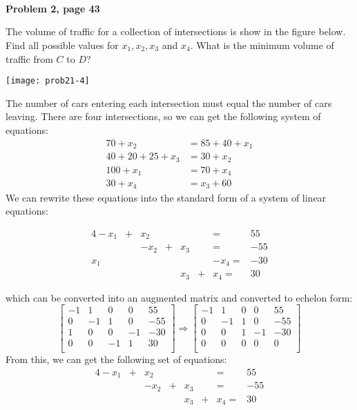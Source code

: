 \documentclass[12pt]{article}
\title{
    \vspace{2in}
    \textmd{\textbf{\hmwkTitle}}\\
    \large\vspace{0.1in}{\hmwkClass}\\
    \large\vspace{0.1in}{\textbf{Date: }\hmwkDueDate}\\
    \vspace{0.1in}{\textbf{Professor: }\hmwkClassInstructor}
    \vspace{1in}
}
\author{\hmwkAuthorName}
\date{}
\begin{document}
\textbf{Problem 2, page 43}

The volume of traffic for a collection of intersections is show in the figure below. Find all possible values for $x_1, x_2, x_3$ and $x_4$. What is the minimum volume of traffic from $C$ to $D$?

\texttt{[image: prob21-4]}

\begin{solution}
The number of cars entering each intersection must equal the number of cars leaving. There are four intersections, so  we can get the following system of equations:
\begin{align*}
70 + x_2 &= 85 + 40 + x_1 \label{A} \\
40 + 20 + 25 + x_3 &= 30 + x_2 \\
100 + x_1 &= 70 + x_4 \\
30 + x_4 &= x_3 + 60
\end{align*}
We can rewrite these equations into the standard form of a system of linear equations:

\begin{alignat*}{4}
-x_1  & {}+{} & x_2  & {}{} & {}{}  & {}{} & {}={} & 55 \\
 {}{} & {}{} &  -x_2 & {}+{} &  x_3 & {}{} & {}={} &  -55 \\
  x_1 & {}{} & {}{} & {}{} & {}{} & {}{} & -x_4 {}={} & -30 \\
 {}{} & {}{} & {}{} & {}{} & x_3 & {}+{} & x_4 {}={} & 30
\end{alignat*}

which can be converted into an augmented matrix and converted to echelon form:
$$\begin{bmatrix} -1 & 1 & 0 & 0 & 55 \\ 
				   0 & -1 & 1 & 0 & -55\\ 
				   1 & 0 & 0 & -1 & -30 \\
				   0 & 0 & -1 & 1 & 30 \\
				   \end{bmatrix} \Rightarrow 
\begin{bmatrix} -1 & 1 & 0 & 0 & 55 \\ 
				   0 & -1 & 1 & 0 & -55\\ 
				   0 & 0 & 1 & -1 & -30 \\
				   0 & 0 & 0 & 0 & 0 \\
				   \end{bmatrix}$$
From this, we can get the following set of equations:
\begin{alignat*}{4}
-x_1  & {}+{} & x_2  & {}{} & {}{}  & {}{} & {}={} & 55 \\
 {}{} & {}{} &  -x_2 & {}+{} &  x_3 & {}{} & {}={} &  -55 \\
 {}{} & {}{} & {}{} & {}{} & x_3 & {}+{} & x_4 {}={} & 30
\end{alignat*}


\end{solution}
\end{document}
